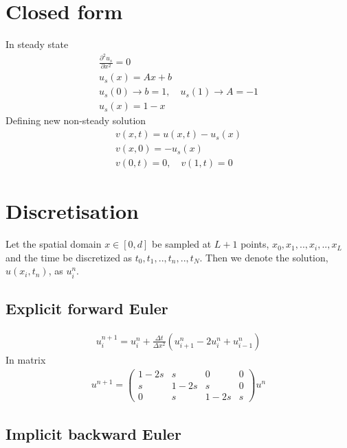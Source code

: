 \documentclass[11pt,a4paper,draft]{article}
\numberwithin{equation}{section}
\begin{document}
\section{Closed form}
In steady state
\begin{gather}
\frac{\partial^2 u_s}{\partial x^2} = 0\\
u_s(x) = Ax + b\\
u_s(0) \to b = 1, \quad
u_s(1) \to A = -1\\
u_s(x) = 1-x
\end{gather}
Defining new non-steady solution
\begin{gather}
v(x,t) = u(x,t) - u_s(x)\\
v(x,0) = -u_s(x)\\
v(0,t) = 0, \quad v(1, t) = 0
\end{gather}


\section{Discretisation}

Let the spatial domain $x \in [0,d]$ be sampled at $L+1$ points, $x_0,x_1,..,x_i,..,x_L$ and the time be discretized as $t_0,t_1,..,t_n,..,t_N$. Then we denote the solution, $u(x_i,t_n)$, as $u_i^n$.  

\subsection{Explicit forward Euler}

\begin{gather}
u_i^{n+1} = u_i^n + \frac{\Delta t}{\Delta x^2}\left(
u_{i+1}^n - 2u_i^n + u_{i-1}^n
\right)
\end{gather}
In matrix
\begin{gather}
u^{n+1} = 
\begin{pmatrix}
1 - 2s & s & 0 & 0\\
s & 1 - 2s & s & 0\\
0 & s & 1-2s & s
\end{pmatrix}u^n
\end{gather}



\subsection{Implicit backward Euler}
\end{document}
